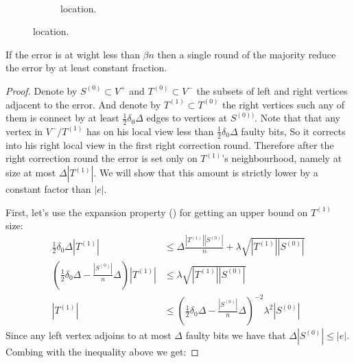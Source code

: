 \documentclass[manuscript,screen,review]{acmart}
\begin{document}
{\begin{figure}[h]
\begin{subfigure}[h]{0.40\textwidth}
\begin{algorithm}[H]
  \end{algorithm}
    \end{subfigure}
    \begin{subfigure}[h]{0.05\textwidth}
      \
    \end{subfigure}
    \begin{subfigure}[h]{0.40\textwidth} 

\caption{location.}
    \label{fig:location}
    \end{subfigure} 
  \end{figure}
  \begin{lemma}
    \label{lemma:reduce}
    If the error is at wight less than $\beta n $ then a single round of the  majority reduce the error by at least constant fraction. 
  \end{lemma}
  \begin{proof}
  Denote by $S^{(0)} \subset V^{+}$ and  $T^{(0)} \subset V^{-}$ the subsets of left and right vertices adjacent to the error. And denote by $T^{(1)} \subset T^{(0)}$ the right vertices such any of them is connect by at least $\frac{1}{2}\delta_{0}\Delta$ edges to vertices at $S^{(0))}$. Note that that any vertex in $V^{-}/T^{(1)}$ has on his local view less than $\frac{1}{2}\delta_{0}\Delta$ faulty bits, So it corrects into his right local view in the first right correction round. Therefore after the right correction round the error is set only on $T^{(1)}$'s neighbourhood, namely at size at most $\Delta|T^{(1)}|$.  We will show that this amount is strictly lower by a constant factor than $|e|$. 

  First, let's use the expansion property () for getting an upper bound on $T^{(1)}$ size: \begin{equation*}
  \begin{split} 
    \frac{1}{2}\delta_{0}\Delta |T^{(1)}| & \le \Delta \frac{|T^{(1)}||S^{(0)}|}{n} + \lambda\sqrt{|T^{(1)}||S^{(0)}|} \\ 
  \left( \frac{1}{2} \delta_{0} \Delta - \frac{|S^{(0)}|}{n} \Delta \right) |T^{(1)}| & \le \lambda \sqrt{|T^{(1)}||S^{(0)}|} \\ 
|T^{(1)}| & \le \left( \frac{1}{2} \delta_{0} \Delta - \frac{|S^{(0)}|}{n} \Delta \right)^{-2}\lambda^{2} |S^{(0)}| 
  \end{split}
\end{equation*}
Since any left vertex adjoins to at most $\Delta$ faulty bits we have that $\Delta|S^{(0)}| \le |e|$. Combing with the inequality above we get:  


\end{proof}}
\end{document}
